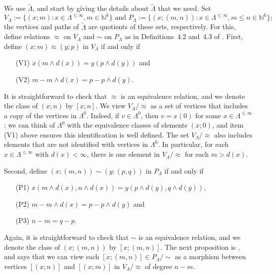 \documentclass[a4paper,12pt]{amsart}
\numberwithin{equation}{section}
\theoremstyle{definition}
\theoremstyle{remark}
\begin{document}
We use $\tilde\Lambda$, and  start by giving the details about $\tilde\Lambda$ that we need. Set \[V_\Lambda:=\{(x;m):x \in \Lambda^{\leq \infty}, m \in {\mathbb{N}}^k\}\text{\ and\ }P_\Lambda:=\{(x;(m,n)):
x \in \Lambda^{\leq \infty}, m \leq n \in {\mathbb{N}}^k\};\] 
the vertices and paths of $\tilde\Lambda$ are quotients of these sets, respectively.  
For this, define relations $\approx$ on $V_\Lambda$ and $\sim$ on 
$P_\Lambda$ as in Definitions~4.2 and~4.3 of \cite{W}. First, 
define $(x;m) \approx (y;p)$  in $V_\Lambda$ if and only if
\begin{enumerate}
\item[(V1)] $x(m\wedge d(x))=y(p\wedge d(y))$ and
\item[(V2)] $m-m\wedge d(x) = p- p \wedge d(y)$.
\end{enumerate}
It is straightforward to check that $\approx$ is an equivalence relation, and we denote the class of $(x;n)$ by $[x;n]$.
We view $V_{\Lambda}/\!\!\approx$ as a set of vertices that includes
a copy of the vertices in $\Lambda^0$. Indeed, if $v \in \Lambda^0$, then $v=x(0)$ for some $x \in \Lambda^{\leq \infty}$; we can think of $\Lambda^0$ with the equivalence classes of elements $(x;0)$, and item (V1) above  ensures
this identification is well defined.   
The set $V_\Lambda/\!\!\approx$ also includes elements that are not identified
with vertices in $\Lambda^0$.  
In particular, for each $x \in \Lambda^{\leq \infty}$ 
with $d(x) < \infty$, there is one element in $V_\Lambda/\!\!\approx$ for each  $m > d(x)$. 
  
Second, define $(x;(m,n))\sim (y;(p,q))$ in $P_\Lambda$ if and only if
\begin{enumerate}
\item[(P1)] $x(m \wedge d(x),n \wedge d(x))=y(p \wedge d(y), q \wedge d(y))$,
\item[(P2)] $m-m \wedge d(x) = p - p \wedge d(y)$ and
\item[(P3)] $n - m = q - p$.
\end{enumerate}
Again, it is straightforward to check that $\sim$ is an equivalence relation, and  we denote the class of $(x;(m,n))$ by $[x;(m,n)]$. The next proposition is \cite[Proposition~4.9]{W}, and says that we can view each $[x;(m,n)] \in P_{\Lambda}/\!\!\sim$ 
as a morphism between vertices $[(x;n)]$ and $[(x;m)]$ in $V_{\Lambda}/\!\!\approx$ of degree $n-m$. 
\end{document}

